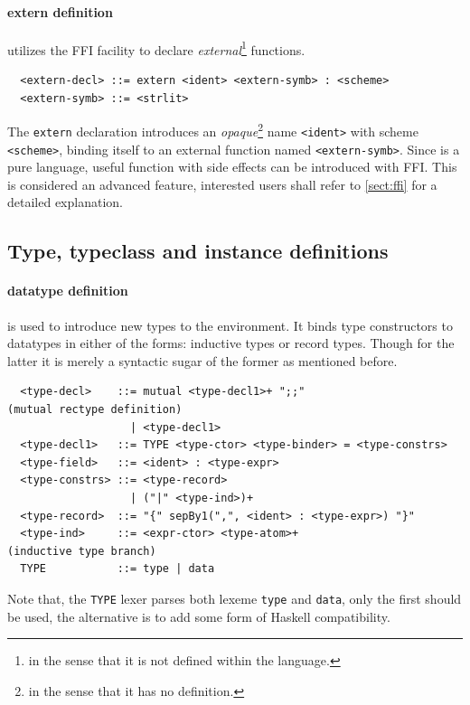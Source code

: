 \documentclass[a4paper, 11pt]{article}
\theoremstyle{remark}\newtheorem*{remark}{Remark}
\theoremstyle{definition}\newtheorem*{definition}{Definition}
\begin{document}
\paragraph{extern definition} utilizes the FFI facility to declare \emph{external}\footnote{in the sense
that it is not defined within the language.}
functions.
\begin{verbatim}
  <extern-decl> ::= extern <ident> <extern-symb> : <scheme>
  <extern-symb> ::= <strlit>
\end{verbatim}
The \texttt{extern} declaration introduces an \emph{opaque}\footnote{
  in the sense that it has no definition.
}
name \texttt{<ident>}
with scheme \texttt{<scheme>},
binding itself to an external function named \texttt{<extern-symb>}. Since \Tigris
is a pure language, useful function with side effects can be introduced with FFI.
This is considered an advanced feature, interested users shall refer to \autoref{sect:ffi}
for a detailed explanation.

\subsection{Type, typeclass and instance definitions}
\paragraph{datatype definition} is used to introduce new types to the environment. It binds type constructors
to datatypes in either of the forms: inductive types or record types. Though for the latter it is merely a
syntactic sugar of the former as mentioned before.
\begin{verbatim}
  <type-decl>    ::= mutual <type-decl1>+ ";;"                     (mutual rectype definition)
                   | <type-decl1>
  <type-decl1>   ::= TYPE <type-ctor> <type-binder> = <type-constrs>
  <type-field>   ::= <ident> : <type-expr>
  <type-constrs> ::= <type-record>
                   | ("|" <type-ind>)+
  <type-record>  ::= "{" sepBy1(",", <ident> : <type-expr>) "}"
  <type-ind>     ::= <expr-ctor> <type-atom>+                      (inductive type branch)
  TYPE           ::= type | data
\end{verbatim}
Note that, the \texttt{TYPE} lexer parses both lexeme \texttt{type} and \texttt{data}, only the first
should be used, the alternative is to add some form of Haskell compatibility.
\end{document}
